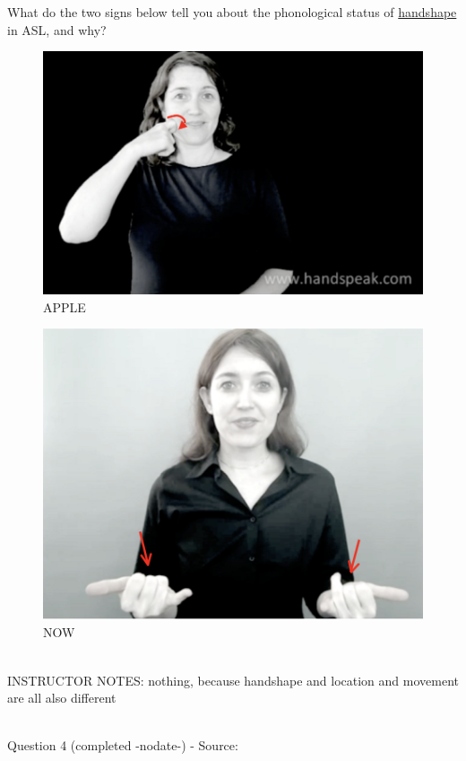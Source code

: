 \documentclass[12pt]{article}
\begin{document}
What do the two signs below tell you about the phonological status of \underline{handshape} in ASL, and why?\\

\begin{figure}[H]
\includegraphics{../images/asl_apple.png}
\caption{APPLE}
\end{figure}
\begin{figure}[H]
\includegraphics{../images/asl_now.png}
\caption{NOW}
\end{figure}

~\\
INSTRUCTOR NOTES: nothing, because handshape and location and movement are all also different


~\\

{\large Question 4} (completed -nodate-) - Source: \\
\end{document}
